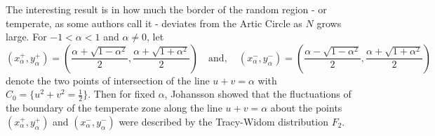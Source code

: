The interesting result is in how much the border of the random region - or temperate, as some authors call it - deviates from the Artic Circle as $N$ grows large. For $-1 < \alpha < 1$ and $\alpha \neq 0$, let
\begin{equation}
	(x_\alpha^+, y_\alpha^+) = \left( 	\frac{\alpha + \sqrt{1-\alpha^2}}{2} , \frac{\alpha + \sqrt{1+\alpha^2}}{2}\right) \quad \text{and}, \quad (x_\alpha^-, y_\alpha^-) = \left( 	\frac{\alpha - \sqrt{1-\alpha^2}}{2} , \frac{\alpha + \sqrt{1+\alpha^2}}{2}\right) 
\end{equation}
denote the two points of intersection of the line $u + v = \alpha$ with $C_0 = \{u^2 + v^2 = \frac{1}{2}\}$. Then for fixed $\alpha$, Johansson showed that the fluctuations of the boundary of the temperate zone along the line $u + v = \alpha$ about the points $(x_\alpha^+ , y_\alpha^+ )$ and $(x_\alpha^- , y_\alpha^-)$ were described by the Tracy-Widom distribution $F_2$.